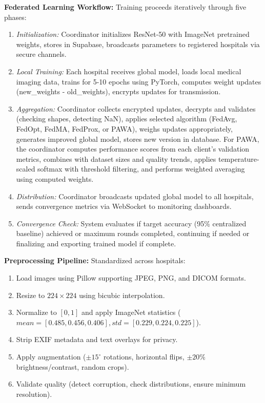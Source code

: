 \textbf{Federated Learning Workflow:} Training proceeds iteratively through five phases:

\begin{enumerate}
    \item \textit{Initialization:} Coordinator initializes ResNet-50 with ImageNet pretrained weights, stores in Supabase, broadcasts parameters to registered hospitals via secure channels.
    \item \textit{Local Training:} Each hospital receives global model, loads local medical imaging data, trains for 5-10 epochs using PyTorch, computes weight updates (new\_weights - old\_weights), encrypts updates for transmission.
    \item \textit{Aggregation:} Coordinator collects encrypted updates, decrypts and validates (checking shapes, detecting NaN), applies selected algorithm (FedAvg, FedOpt, FedMA, FedProx, or PAWA), weighs updates appropriately, generates improved global model, stores new version in database. For PAWA, the coordinator computes performance scores from each client's validation metrics, combines with dataset sizes and quality trends, applies temperature-scaled softmax with threshold filtering, and performs weighted averaging using computed weights.
    \item \textit{Distribution:} Coordinator broadcasts updated global model to all hospitals, sends convergence metrics via WebSocket to monitoring dashboards.
    \item \textit{Convergence Check:} System evaluates if target accuracy (95\% centralized baseline) achieved or maximum rounds completed, continuing if needed or finalizing and exporting trained model if complete.
\end{enumerate}

\textbf{Preprocessing Pipeline:} Standardized across hospitals:
\begin{enumerate}
    \item Load images using Pillow supporting JPEG, PNG, and DICOM formats.
    \item Resize to $224 \times 224$ using bicubic interpolation.
    \item Normalize to $[0,1]$ and apply ImageNet statistics ($mean=[0.485, 0.456, 0.406], std=[0.229, 0.224, 0.225]$).
    \item Strip EXIF metadata and text overlays for privacy.
    \item Apply augmentation ($\pm15^\circ$ rotations, horizontal flips, $\pm20\%$ brightness/contrast, random crops).
    \item Validate quality (detect corruption, check distributions, ensure minimum resolution).
\end{enumerate}

